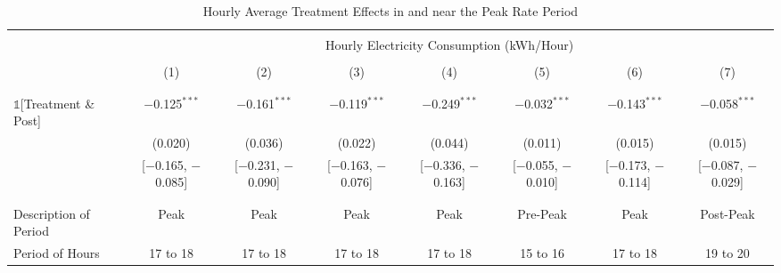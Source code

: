     \begin{sidewaystable}[h!]
        \centering
        \caption{Hourly Average Treatment Effects in and near the Peak Rate Period}
        \label{Table:Hourly-Average-Treatment-Effects-in-and-near-the-Peak-Rate-Period}
        \vspace{0.1cm}
        \small
        \begin{adjustbox}{scale = 0.8}
            \begin{threeparttable}
                \begin{tabular}{@{\extracolsep{3pt}}lccccccc}
                    \\[-5.5ex]
                    \hline \hline
                    \\[-3.0ex]
                    & \multicolumn{7}{c}{Hourly Electricity Consumption  (kWh/Hour)} \\
                    \\[-3.0ex]
                    & (1) & (2) & (3) & (4) & (5) & (6) & (7) \\
                    \\[-3.0ex]
                    \hline
                    \\[-2.0ex]
                    $\mathbb{1}$[Treatment \& Post] & $-$0.125$^{***}$ & $-$0.161$^{***}$ & $-$0.119$^{***}$ & $-$0.249$^{***}$ & $-$0.032$^{***}$ & $-$0.143$^{***}$ & $-$0.058$^{***}$ \\
                    & (0.020) & (0.036) & (0.022) & (0.044) & (0.011) & (0.015) & (0.015) \\
                    & [$-$0.165, $-$0.085] & [$-$0.231, $-$0.090] & [$-$0.163, $-$0.076] & [$-$0.336, $-$0.163] & [$-$0.055, $-$0.010] & [$-$0.173, $-$0.114] & [$-$0.087, $-$0.029] \\
                    & & & & & & & \\
                    \hline
                    \\[-2.0ex]
                    Description of Period & Peak & Peak & Peak & Peak & Pre-Peak & Peak & Post-Peak \\
                    Period of Hours & 17 to 18 & 17 to 18 & 17 to 18 & 17 to 18 & 15 to 16 & 17 to 18 & 19 to 20 \\

\end{tabular}
\end{threeparttable}
\end{adjustbox}
\end{sidewaystable}
